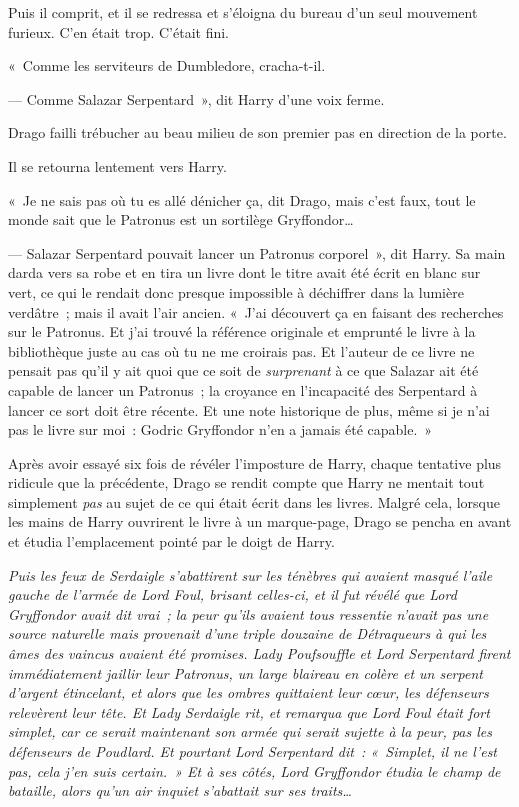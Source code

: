 Puis il comprit, et il se redressa et s'éloigna du bureau d'un seul mouvement furieux. C'en était trop. C'était fini.

«~Comme les serviteurs de Dumbledore, cracha-t-il.

--- Comme Salazar Serpentard~», dit Harry d'une voix ferme.

Drago failli trébucher au beau milieu de son premier pas en direction de la porte.

Il se retourna lentement vers Harry.

«~Je ne sais pas où tu es allé dénicher ça, dit Drago, mais c'est faux, tout le monde sait que le Patronus est un sortilège Gryffondor…

--- Salazar Serpentard pouvait lancer un Patronus corporel~», dit Harry. Sa main darda vers sa robe et en tira un livre dont le titre avait été écrit en blanc sur vert, ce qui le rendait donc presque impossible à déchiffrer dans la lumière verdâtre~; mais il avait l'air ancien. «~J'ai découvert ça en faisant des recherches sur le Patronus. Et j'ai trouvé la référence originale et emprunté le livre à la bibliothèque juste au cas où tu ne me croirais pas. Et l'auteur de ce livre ne pensait pas qu'il y ait quoi que ce soit de \emph{surprenant} à ce que Salazar ait été capable de lancer un Patronus~; la croyance en l'incapacité des Serpentard à lancer ce sort doit être récente. Et une note historique de plus, même si je n'ai pas le livre sur moi~: Godric Gryffondor n'en a jamais été capable.~»

Après avoir essayé six fois de révéler l'imposture de Harry, chaque tentative plus ridicule que la précédente, Drago se rendit compte que Harry ne mentait tout simplement \emph{pas} au sujet de ce qui était écrit dans les livres. Malgré cela, lorsque les mains de Harry ouvrirent le livre à un marque-page, Drago se pencha en avant et étudia l'emplacement pointé par le doigt de Harry.

\emph{Puis les feux de Serdaigle s'abattirent sur les ténèbres qui avaient masqué l'aile gauche de l'armée de Lord Foul, brisant celles-ci, et il fut révélé que Lord Gryffondor avait dit vrai~; la peur qu'ils avaient tous ressentie n'avait pas une source naturelle mais provenait d'une triple douzaine de Détraqueurs à qui les âmes des vaincus avaient été promises. Lady Poufsouffle et Lord Serpentard firent immédiatement jaillir leur Patronus, un large blaireau en colère et un serpent d'argent étincelant, et alors que les ombres quittaient leur cœur, les défenseurs relevèrent leur tête. Et Lady Serdaigle rit, et remarqua que Lord Foul était fort simplet, car ce serait maintenant son armée qui serait sujette à la peur, pas les défenseurs de Poudlard. Et pourtant Lord Serpentard dit~: «~Simplet, il ne l'est pas, cela j'en suis certain.~» Et à ses côtés, Lord Gryffondor étudia le champ de bataille, alors qu'un air inquiet s'abattait sur ses traits…}

